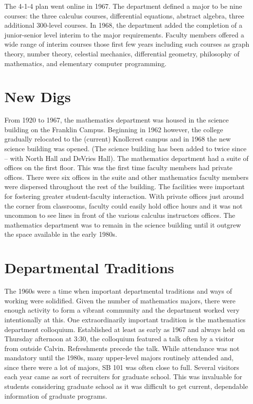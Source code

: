 \documentclass[
]{book}
\begin{document}
The 4-1-4 plan went online in 1967. The department defined a major to be nine courses: the three calculus courses, differential equations, abstract algebra, three additional 300-level courses. In 1968, the department added the completion of a junior-senior level interim to the major requirements. Faculty members offered a wide range of interim courses those first few years including such courses as graph theory, number theory, celestial mechanics, differential geometry, philosophy of mathematics, and elementary computer programming.

\hypertarget{new-digs}{%
\section{New Digs}\label{new-digs}}

From 1920 to 1967, the mathematics department was housed in the science building on the Franklin Campus. Beginning in 1962 however, the college gradually relocated to the (current) Knollcrest campus and in 1968 the new science building was opened. (The science building has been added to twice since -- with North Hall and DeVries Hall). The mathematics department had a suite of offices on the first floor. This was the first time faculty members had private offices. There were six offices in the suite and other mathematics faculty members were dispersed throughout the rest of the building. The facilities were important for fostering greater student-faculty interaction. With private offices just around the corner from classrooms, faculty could easily hold office hours and it was not uncommon to see lines in front of the various calculus instructors offices. The mathematics department was to remain in the science building until it outgrew the space available in the early 1980s.

\hypertarget{departmental-traditions}{%
\section{Departmental Traditions}\label{departmental-traditions}}

The 1960s were a time when important departmental traditions and ways of working were solidified. Given the number of mathematics majors, there were enough activity to form a vibrant community and the department worked very intentionally at this. One extraordinarily important tradition is the mathematics department colloquium. Established at least as early as 1967 and always held on Thursday afternoon at 3:30, the colloquium featured a talk often by a visitor from outside Calvin. Refreshments precede the talk. While attendance was not mandatory until the 1980s, many upper-level majors routinely attended and, since there were a lot of majors, SB 101 was often close to full. Several visitors each year came as sort of recruiters for graduate school. This was invaluable for students considering graduate school as it was difficult to get current, dependable information of graduate programs.
\end{document}
